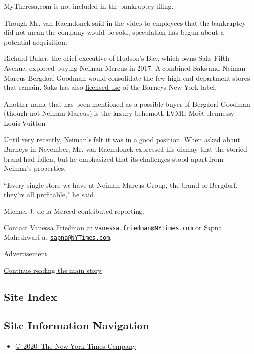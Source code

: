 MyTheresa.com is not included in the bankruptcy filing.

Though Mr. van Raemdonck said in the video to employees that the
bankruptcy did not mean the company would be sold, speculation has begun
about a potential acquisition.

Richard Baker, the chief executive of Hudson's Bay, which owns Saks
Fifth Avenue, explored buying Neiman Marcus in 2017. A combined Saks and
Neiman Marcus-Bergdorf Goodman would consolidate the few high-end
department stores that remain. Saks has also
\href{https://www.nytimes3xbfgragh.onion/2019/11/09/sunday-review/barneys-saks.html}{licensed
use} of the Barneys New York label.

Another name that has been mentioned as a possible buyer of Bergdorf
Goodman (though not Neiman Marcus) is the luxury behemoth LVMH Moët
Hennessy Louis Vuitton.

Until very recently, Neiman's felt it was in a good position. When asked
about Barneys in November, Mr. van Raemdonck expressed his dismay that
the storied brand had fallen, but he emphasized that its challenges
stood apart from Neiman's properties.

``Every single store we have at Neiman Marcus Group, the brand or
Bergdorf, they're all profitable,'' he said.

Michael J. de la Merced contributed reporting.

Contact Vanessa Friedman at
\href{mailto:vanessa.friedman@NYTimes.com}{\nolinkurl{vanessa.friedman@NYTimes.com}}
or Sapna Maheshwari at
\href{mailto:sapna@NYTimes.com}{\nolinkurl{sapna@NYTimes.com}}.

Advertisement

\protect\hyperlink{after-bottom}{Continue reading the main story}

\hypertarget{site-index}{%
\subsection{Site Index}\label{site-index}}

\hypertarget{site-information-navigation}{%
\subsection{Site Information
Navigation}\label{site-information-navigation}}

\begin{itemize}
\tightlist
\item
  \href{https://help.nytimes3xbfgragh.onion/hc/en-us/articles/115014792127-Copyright-notice}{©~2020~The
  New York Times Company}
\end{itemize}

